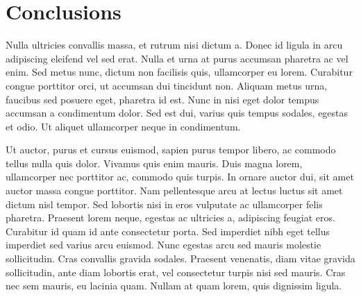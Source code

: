 \section{Conclusions}

Nulla ultricies convallis massa, et rutrum nisi dictum a. Donec id ligula in arcu adipiscing eleifend vel sed erat. Nulla et urna at purus accumsan pharetra ac vel enim. Sed metus nunc, dictum non facilisis quis, ullamcorper eu lorem. Curabitur congue porttitor orci, ut accumsan dui tincidunt non. Aliquam metus urna, faucibus sed posuere eget, pharetra id est. Nunc in nisi eget dolor tempus accumsan a condimentum dolor. Sed est dui, varius quis tempus sodales, egestas et odio. Ut aliquet ullamcorper neque in condimentum.

Ut auctor, purus et cursus euismod, sapien purus tempor libero, ac commodo tellus nulla quis dolor. Vivamus quis enim mauris. Duis magna lorem, ullamcorper nec porttitor ac, commodo quis turpis. In ornare auctor dui, sit amet auctor massa congue porttitor. Nam pellentesque arcu at lectus luctus sit amet dictum nisl tempor. Sed lobortis nisi in eros vulputate ac ullamcorper felis pharetra. Praesent lorem neque, egestas ac ultricies a, adipiscing feugiat eros. Curabitur id quam id ante consectetur porta. Sed imperdiet nibh eget tellus imperdiet sed varius arcu euismod. Nunc egestas arcu sed mauris molestie sollicitudin. Cras convallis gravida sodales. Praesent venenatis, diam vitae gravida sollicitudin, ante diam lobortis erat, vel consectetur turpis nisi sed mauris. Cras nec sem mauris, eu lacinia quam. Nullam at quam lorem, quis dignissim ligula.




